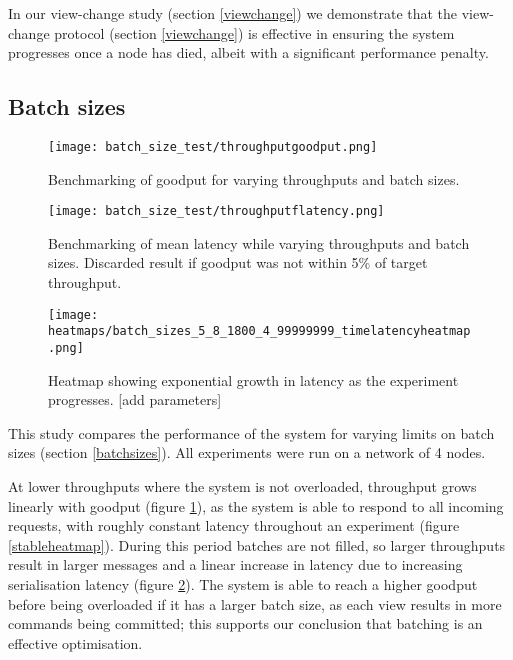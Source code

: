 In our view-change study (section \ref{viewchange}) we demonstrate that the view-change protocol (section \ref{viewchange}) is effective in ensuring the system progresses once a node has died, albeit with a significant performance penalty.

\subsection{Batch sizes} \label{batchsizeseval}

\begin{figure}[h!]
\centering
\texttt{[image: batch\_size\_test/throughputgoodput.png]}
\caption{Benchmarking of goodput for varying throughputs and batch sizes.}
\label{throughputgoodputbatch}
\end{figure}

\begin{figure}[h!]
\centering
\texttt{[image: batch\_size\_test/throughputflatency.png]}
\caption{Benchmarking of mean latency while varying throughputs and batch sizes. Discarded result if goodput was not within 5\% of target throughput.}
\label{throughputlatencybatch}
\end{figure}

\begin{figure}[h!]
\centering
\texttt{[image: heatmaps/batch\_sizes\_5\_8\_1800\_4\_99999999\_timelatencyheatmap.png]}
\caption{Heatmap showing exponential growth in latency as the experiment progresses. [add parameters]}
\label{expheatmap}
\end{figure}

This study compares the performance of the system for varying limits on batch sizes (section \ref{batchsizes}). All experiments were run on a network of 4 nodes.

At lower throughputs where the system is not overloaded, throughput grows linearly with goodput (figure \ref{throughputgoodputbatch}), as the system is able to respond to all incoming requests, with roughly constant latency throughout an experiment (figure \ref{stableheatmap}). During this period batches are not filled, so larger throughputs result in larger messages and a linear increase in latency due to increasing serialisation latency (figure \ref{throughputlatencybatch}). The system is able to reach a higher goodput before being overloaded if it has a larger batch size, as each view results in more commands being committed; this supports our conclusion that batching is an effective optimisation.

